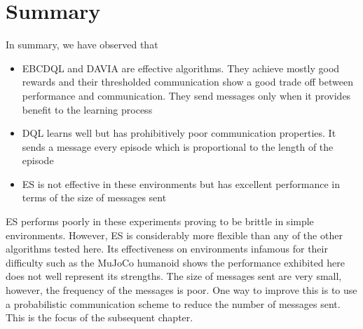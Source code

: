 \section{Summary}
In summary, we have observed that 
\begin{itemize}
    \item EBCDQL and DAVIA are effective algorithms. They achieve mostly good rewards and their thresholded communication show a good trade off between performance and communication. They send messages only when it provides benefit to the learning process
    \item DQL learns well but has prohibitively poor communication properties. It sends a message every episode which is proportional to the length of the episode
    \item ES is not effective in these environments but has excellent performance in terms of the size of messages sent
\end{itemize}

ES performs poorly in these experiments proving to be brittle in simple environments. However, ES is considerably more flexible than any of the other algorithms tested here. Its effectiveness on environments infamous for their difficulty such as the MuJoCo humanoid shows the performance exhibited here does not well represent its strengths. The size of messages sent are very small, however, the frequency of the messages is poor. One way to improve this is to use a probabilistic communication scheme to reduce the number of messages sent. This is the focus of the subsequent chapter.



